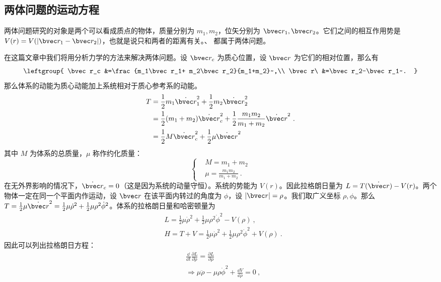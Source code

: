 

\subsection{两体问题的运动方程}
两体问题研究的对象是两个可以看成质点的物体，质量分别为 $m_1,m_2$，位矢分别为 $\bvec r_1,\bvec r_2$。它们之间的相互作用势是 $V(r)=V(|\bvec r_1-\bvec r_2|)$，也就是说只和两者的距离有关。、 都属于两体问题。

在这篇文章中我们将用分析力学的方法来解决两体问题。设 $\bvec r_c$ 为质心位置，设 $\bvec r$ 为它们的相对位置，那么有
\begin{equation}
\leftgroup{
\bvec r_c &=\frac{m_1\bvec r_1+ m_2\bvec r_2}{m_1+m_2}~,\\
\bvec r\  &=\bvec r_2-\bvec r_1~.
}\end{equation}
那么体系的动能为质心动能加上系统相对于质心参考系的动能。
\begin{equation}
\begin{aligned}
T&=\frac{1}{2}m_1 \dot{\bvec r}_1^2+\frac{1}{2}m_2 \dot{\bvec r}_2^2\\
&=\frac{1}{2}(m_1+m_2)\dot{\bvec r}_c^2+\frac{1}{2}\frac{m_1m_2}{m_1+m_2}\dot{\bvec r}^2\\
&=\frac{1}{2}M \dot{\bvec r}_c^2+\frac{1}{2}\mu \dot{\bvec r}^2
\end{aligned}~.
\end{equation}
其中 $M$ 为体系的总质量，$\mu$ 称作约化质量：
\begin{equation}
\left\{
\begin{aligned}
&M=m_1+m_2\\
&\mu=\frac{m_1m_2}{m_1+m_2}~.
\end{aligned}
\right.
\end{equation}
在无外界影响的情况下，$\dot{\bvec r}_c=0$（这是因为系统的动量守恒）。系统的势能为 $V(r)$。因此拉格朗日量为 $L=T(\dot{\bvec r})-V(r)$。两个物体一定在同一个平面内作运动，设 $\bvec r$ 在该平面内转过的角度为 $\phi$，设 $|\bvec r|=\rho$。我们取广义坐标 $\rho,\phi$。那么 $T=\frac{1}{2}\mu \dot{\bvec r}^2=\frac{1}{2}\mu \dot \rho^2+\frac{1}{2}\mu \rho^2\dot\phi^2$。体系的拉格朗日量和哈密顿量为
\begin{equation}
\begin{aligned}
&L=\frac{1}{2}\mu \dot \rho^2+\frac{1}{2}\mu \rho^2\dot\phi^2-V(\rho)~,\\
&H=T+V=\frac{1}{2}\mu \dot \rho^2+\frac{1}{2}\mu \rho^2\dot\phi^2+V(\rho)~.
\end{aligned}
\end{equation}
因此可以列出拉格朗日方程：
\begin{equation}\label{eq_twoobj_1}
\begin{aligned}
&\frac{\dd }{\dd t}\frac{\partial L}{\partial \dot\rho}=\frac{\partial L}{\partial \rho}\\&\Rightarrow \mu\ddot\rho-\mu\rho\dot\phi^2+\frac{\dd V}{\dd \rho}=0~,
\end{aligned}
\end{equation}

